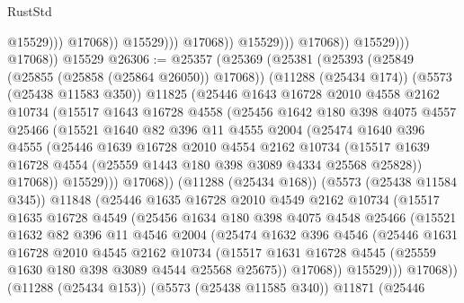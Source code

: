 \begin{lexlean}{RustStd}
\begin{coremodule}
                                            @15529)))
                                      @17068))
                                  @15529)))
                            @17068))
                        @15529)))
                  @17068))
              @15529)))
        @17068))
    @15529
@26306 := @25357
    (@25369
      (@25381
        (@25393
          (@25849 (@25855 (@25858 (@25864 @26050)) @17068))
          (@11288 (@25434 @174))
          (@5573 (@25438 @11583 @350))
          @11825
          (@25446
            @1643
            @16728
            @2010
            @4558
            @2162
            @10734
            (@15517
              @1643
              @16728
              @4558
              (@25456
                @1642
                @180
                @398
                @4075
                @4557
                @25466
                (@15521
                  @1640
                  @82
                  @396
                  @11
                  @4555
                  @2004
                  (@25474
                    @1640
                    @396
                    @4555
                    (@25446
                      @1639
                      @16728
                      @2010
                      @4554
                      @2162
                      @10734
                      (@15517 @1639 @16728 @4554 (@25559 @1443 @180 @398 @3089 @4334 @25568 @25828))
                      @17068))
                  @15529)))
            @17068))
        (@11288 (@25434 @168))
        (@5573 (@25438 @11584 @345))
        @11848
        (@25446
          @1635
          @16728
          @2010
          @4549
          @2162
          @10734
          (@15517
            @1635
            @16728
            @4549
            (@25456
              @1634
              @180
              @398
              @4075
              @4548
              @25466
              (@15521
                @1632
                @82
                @396
                @11
                @4546
                @2004
                (@25474
                  @1632
                  @396
                  @4546
                  (@25446
                    @1631
                    @16728
                    @2010
                    @4545
                    @2162
                    @10734
                    (@15517 @1631 @16728 @4545 (@25559 @1630 @180 @398 @3089 @4544 @25568 @25675))
                    @17068))
                @15529)))
          @17068))
      (@11288 (@25434 @153))
      (@5573 (@25438 @11585 @340))
      @11871
      (@25446

\end{coremodule}
\end{lexlean}
